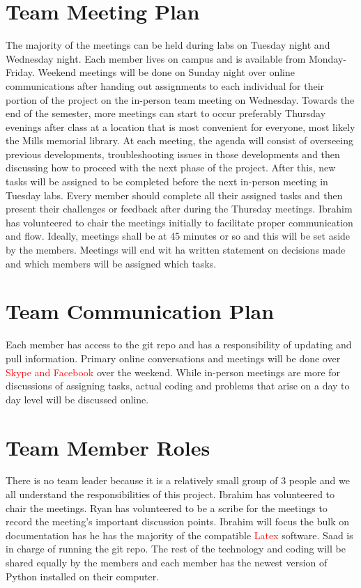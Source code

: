 \documentclass{article}
\begin{document}
\section{Team Meeting Plan}
\smallskip
The majority of the meetings can be held during labs on Tuesday night and Wednesday night. Each member lives on campus and is available from Monday-Friday. Weekend meetings will be done on Sunday night over online communications after handing out assignments to each individual for their portion of the project on the in-person team meeting on Wednesday. Towards the end of the semester, more meetings can start to occur preferably Thursday evenings after class at a location that is most convenient for everyone, most likely the Mills memorial library. At each meeting, the agenda will consist of overseeing previous developments, troubleshooting issues in those developments and then discussing how to proceed with the next phase of the project. After this, new tasks will be assigned to be completed before the next in-person meeting in Tuesday labs. Every member should complete all their assigned tasks and then present their challenges or feedback after during the Thursday meetings. Ibrahim has volunteered to chair the meetings initially to facilitate proper communication and flow. Ideally, meetings shall be at 45 minutes or so and this will be set aside by the members. Meetings will end wit ha written statement on decisions made and which members will be assigned which tasks.

\section{Team Communication Plan}
\smallskip
Each member has access to the git repo and has a responsibility of updating and pull information. Primary online conversations and meetings will be done over \textcolor{red}{Skype and Facebook} over the weekend. While in-person meetings are more for discussions of assigning tasks, actual coding and problems that arise on a day to day level will be discussed online.

\section{Team Member Roles}
\smallskip
There is no team leader because it is a relatively small group of 3 people and we all understand the responsibilities of this project. Ibrahim has volunteered to chair the meetings. Ryan has volunteered to be a scribe for the meetings to record the meeting's important discussion points. Ibrahim will focus the bulk on documentation has he has the majority of the compatible \textcolor{red}{Latex} software. Saad is in charge of running the git repo. The rest of the technology and coding will be shared equally by the members and each member has the newest version of Python installed on their computer. 
\end{document}
